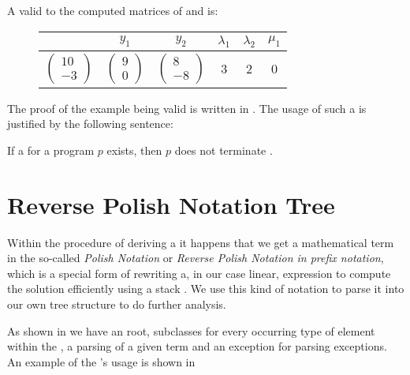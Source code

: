 \begin{example}
	A valid \gna to the computed matrices of  and  is:\newline
	\begin{figure}[H]
		\centering
		\begin{tabular}{|c|c|c|c|c|c|}
			\hline
			\stem & $y_1$ & $y_2$ & $\lambda_1$ & $\lambda_2$ & $\mu_1$ \\ \hline
			$\begin{pmatrix} 10 \\ -3 \end{pmatrix}$ & $\begin{pmatrix} 9 \\ 0 \end{pmatrix}$ & $\begin{pmatrix} 8 \\ -8 \end{pmatrix}$ & 3 & 2 & 0 \\ \hline
		\end{tabular}
	\end{figure}
\end{example}
The proof of the example being valid is written in .
The usage of such a \gna is justified by the following sentence:
\begin{satz}
	\label{sen:gna-nonterm}
	If a \gna for a program $p$ exists, then $p$ does not terminate \cite{leike2014geometric}.
\end{satz}

\section{Reverse Polish Notation Tree}
\label{sec:rpntree}
Within the procedure of deriving a \gna it happens that we get a mathematical term in the so-called \textit{Polish Notation} or \textit{Reverse Polish Notation in prefix notation}, which is a special form of rewriting a, in our case linear, expression to compute the solution efficiently using a stack \cite{wikirpn}. We use this kind of notation to parse it into our own tree structure to do further analysis.

As shown in  we have an  root, subclasses for every occurring type of element within the \its, a  parsing of a given term and an exception for parsing exceptions.
An example of the \rpntree's usage is shown in 

